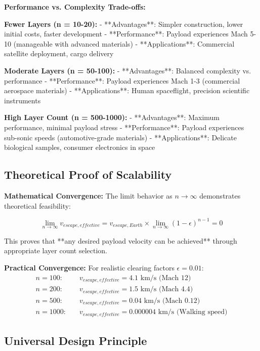 \documentclass[12pt,a4paper]{article}
\begin{document}
\textbf{Performance vs. Complexity Trade-offs:}

\textbf{Fewer Layers (n = 10-20):}
- **Advantages**: Simpler construction, lower initial costs, faster development
- **Performance**: Payload experiences Mach 5-10 (manageable with advanced materials)
- **Applications**: Commercial satellite deployment, cargo delivery

\textbf{Moderate Layers (n = 50-100):}
- **Advantages**: Balanced complexity vs. performance
- **Performance**: Payload experiences Mach 1-3 (commercial aerospace materials)
- **Applications**: Human spaceflight, precision scientific instruments

\textbf{High Layer Count (n = 500-1000):}
- **Advantages**: Maximum performance, minimal payload stress
- **Performance**: Payload experiences sub-sonic speeds (automotive-grade materials)
- **Applications**: Delicate biological samples, consumer electronics in space

\subsection{Theoretical Proof of Scalability}

\textbf{Mathematical Convergence:}
The limit behavior as $n \to \infty$ demonstrates theoretical feasibility:

\begin{equation}
\lim_{n \to \infty} v_{escape,effective} = v_{escape,Earth} \times \lim_{n \to \infty} (1 - \epsilon)^{n-1} = 0
\end{equation}

This proves that **any desired payload velocity can be achieved** through appropriate layer count selection.

\textbf{Practical Convergence:}
For realistic clearing factors $\epsilon = 0.01$:
\begin{align}
n = 100: &\quad v_{escape,effective} = 4.1 \text{ km/s (Mach 12)} \\
n = 200: &\quad v_{escape,effective} = 1.5 \text{ km/s (Mach 4.4)} \\
n = 500: &\quad v_{escape,effective} = 0.04 \text{ km/s (Mach 0.12)} \\
n = 1000: &\quad v_{escape,effective} = 0.000004 \text{ km/s (Walking speed)}
\end{align}

\subsection{Universal Design Principle}
\end{document}
